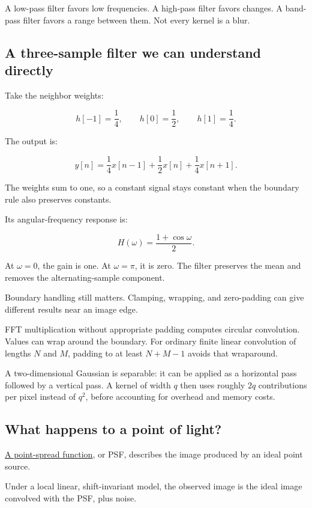 A low-pass filter favors low frequencies. A high-pass filter favors changes. A band-pass filter favors a range between them. Not every kernel is a blur.

\subsection{A three-sample filter we can understand directly}\label{04-visual-computing-ii-ch043-a-three-sample-filter-we-can-understand-directly}

Take the neighbor weights:

\[
h[-1]=\frac14,\qquad h[0]=\frac12,\qquad h[1]=\frac14.
\]

The output is:

\[
y[n]=\frac14x[n-1]+\frac12x[n]+\frac14x[n+1].
\]

The weights sum to one, so a constant signal stays constant when the boundary rule also preserves constants.

Its angular-frequency response is:

\[
H(\omega)=\frac{1+\cos\omega}{2}.
\]

At \(\omega=0\), the gain is one. At \(\omega=\pi\), it is zero. The filter preserves the mean and removes the alternating-sample component.

Boundary handling still matters. Clamping, wrapping, and zero-padding can give different results near an image edge.

FFT multiplication without appropriate padding computes circular convolution. Values can wrap around the boundary. For ordinary finite linear convolution of lengths \(N\) and \(M\), padding to at least \(N+M-1\) avoids that wraparound.

A two-dimensional Gaussian is separable: it can be applied as a horizontal pass followed by a vertical pass. A kernel of width \(q\) then uses roughly \(2q\) contributions per pixel instead of \(q^2\), before accounting for overhead and memory costs.

\subsection{What happens to a point of light?}\label{04-visual-computing-ii-ch043-what-happens-to-a-point-of-light}

\hyperref[appendix-8b76b0efd27f]{A point-spread function}, or PSF, describes the image produced by an ideal point source.

Under a local linear, shift-invariant model, the observed image is the ideal image convolved with the PSF, plus noise.

